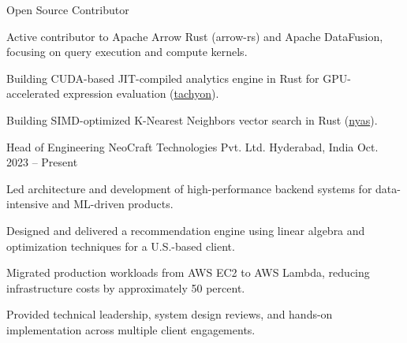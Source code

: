 
\begin{cventries}

\cventry
  {Open Source Contributor}
  {}
  {}
  {}
  {
      \begin{cvitems}
        \item {Active contributor to Apache Arrow Rust (arrow-rs) and Apache DataFusion, focusing on query execution and compute kernels.}
        \item {Building CUDA-based JIT-compiled analytics engine in Rust for GPU-accelerated expression evaluation (\href{https://github.com/neocrafttech/tachyon}{tachyon}).}
        \item {Building SIMD-optimized K-Nearest Neighbors vector search in Rust (\href{https://github.com/neocrafttech/nyas}{nyas}).}
      \end{cvitems}
  }
  
  \cventry
    {Head of Engineering}
    {NeoCraft Technologies Pvt. Ltd.}
    {Hyderabad, India}
    {Oct. 2023 – Present}
    {
      \begin{cvitems}
        \item {Led architecture and development of high-performance backend systems for data-intensive and ML-driven products.}
        \item {Designed and delivered a recommendation engine using linear algebra and optimization techniques for a U.S.-based client.}
        \item {Migrated production workloads from AWS EC2 to AWS Lambda, reducing infrastructure costs by approximately 50 percent.}
        \item {Provided technical leadership, system design reviews, and hands-on implementation across multiple client engagements.}
      \end{cvitems}
    }
    

\end{cventries}
